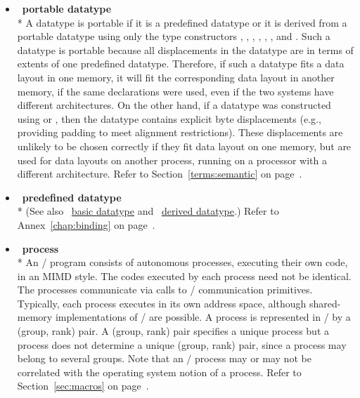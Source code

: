 \begin{itemize}
\label{glossary:portable_datatype}
\item  ~\hypertarget{glossary:portable_datatype}{\textbf{portable datatype}} \\*
A datatype is portable if it is a predefined datatype or it is derived
from a portable datatype using only the type constructors
, ,
,
,
, , and
.
Such a datatype is portable because all displacements in the datatype
are in terms of extents of one predefined datatype.  Therefore, if such a
datatype fits a data layout in one memory, it will fit the
corresponding data layout in another memory, if the same declarations
were used, even if the two systems have different architectures.  On
the other hand, if a datatype was constructed using
 or , 
then the datatype contains explicit byte
displacements (e.g., providing padding to meet alignment restrictions).
These displacements are unlikely to be chosen correctly if they fit
data layout on one memory, but are used for data layouts on another
process, running on a processor with a different architecture.
Refer to Section~\ref{terms:semantic} on page~\pageref{terms:semantic}.

\label{glossary:predefined_datatype}
\item  ~\hypertarget{glossary:predefined_datatype}{\textbf{predefined datatype}} \\*
(See also ~\hyperlink{glossary:basic_datatype}{basic datatype} and
~\hyperlink{glossary:derived_datatype}{derived datatype}.)
Refer to Annex~\ref{chap:binding} on page~\pageref{chap:binding}.

\label{glossary:process}
\item  ~\hypertarget{glossary:process}{\textbf{process}} \\*
An \MPI/ program consists of autonomous processes, executing their own
code, in an 
MIMD style. The codes executed by each process need not be
identical.  The processes communicate via calls to \MPI/ communication
primitives.  Typically, each process executes in its own address
space, although shared-memory implementations of \MPI/ are possible.
A process is represented in \MPI/ by a (group, rank) pair. 
A (group, rank) pair specifies a unique process but 
a process does not determine a unique (group, rank) pair, since
a process may belong to several groups.
Note that an \MPI/ process may or may not be correlated with
the operating system notion of a process.
Refer to Section~\ref{sec:macros} on page~\pageref{sec:macros}.


\end{itemize}
